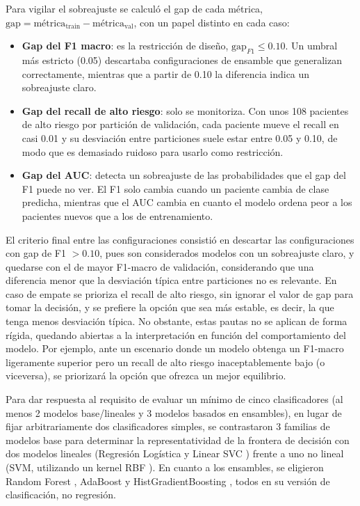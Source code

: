 \documentclass[journal,onecolumn]{IEEEtran}
\begin{document}
Para vigilar el sobreajuste se calculó el gap de cada métrica, $\text{gap} = \text{métrica}_{\text{train}} - \text{métrica}_{\text{val}}$, con un papel distinto en cada caso:

\begin{itemize}
    \item \textbf{Gap del F1 macro}: es la restricción de diseño, $\text{gap}_{F1} \leq 0.10$. Un umbral más estricto (0.05) descartaba configuraciones de ensamble que generalizan correctamente, mientras que a partir de 0.10 la diferencia indica un sobreajuste claro.
    
    \item \textbf{Gap del recall de alto riesgo}: solo se monitoriza. Con unos 108 pacientes de alto riesgo por partición de validación, cada paciente mueve el recall en casi 0.01 y su desviación entre particiones suele estar entre 0.05 y 0.10, de modo que es demasiado ruidoso para usarlo como restricción.
    
    \item \textbf{Gap del AUC}: detecta un sobreajuste de las probabilidades que el gap del F1 puede no ver. El F1 solo cambia cuando un paciente cambia de clase predicha, mientras que el AUC cambia en cuanto el modelo ordena peor a los pacientes nuevos que a los de entrenamiento.
\end{itemize}

El criterio final entre las configuraciones consistió en descartar las configuraciones con gap de F1 $> 0.10$, pues son considerados modelos con un sobreajuste claro, y quedarse con el de mayor F1-macro de validación, considerando que una diferencia menor que la desviación típica entre particiones no es relevante. En caso de empate se prioriza el recall de alto riesgo, sin ignorar el valor de gap para tomar la decisión, y se prefiere la opción que sea más estable, es decir, la que tenga menos desviación típica. No obstante, estas pautas no se aplican de forma rígida, quedando abiertas a la interpretación en función del comportamiento del modelo. Por ejemplo, ante un escenario donde un modelo obtenga un F1-macro ligeramente superior pero un recall de alto riesgo inaceptablemente bajo (o viceversa), se priorizará la opción que ofrezca un mejor equilibrio. 

Para dar respuesta al requisito de evaluar un mínimo de cinco clasificadores (al menos 2 modelos base/lineales y 3 modelos basados en ensambles), en lugar de fijar arbitrariamente dos clasificadores simples, se contrastaron 3 familias de modelos base para determinar la representatividad de la frontera de decisión con dos modelos lineales (Regresión Logística \cite{hastie2009elements} y Linear SVC \cite{fan2008liblinear}) frente a uno no lineal (SVM, utilizando un kernel RBF \cite{cortes1995svm}). En cuanto a los ensambles, se eligieron Random Forest \cite{breiman2001rf}, AdaBoost \cite{freund1997adaboost,hastie2009samme} y HistGradientBoosting \cite{friedman2001gbm,ke2017lightgbm}, todos en su versión de clasificación, no regresión. 
\end{document}
